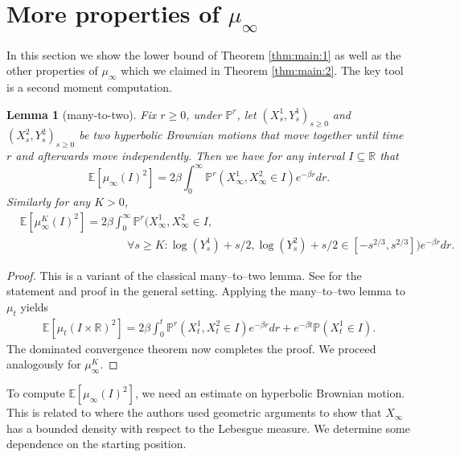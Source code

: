 \documentclass{article}
\newtheorem{lem}[thm]{Lemma}
\theoremstyle{definition}
\numberwithin{equation}{section}
\numberwithin{thm}{section}
\newcommand*{\RR}{\ensuremath{\mathbb{R}}}	        	%
\newcommand*{\EE}{\ensuremath{\mathbb{E}}}	        	%
\newcommand*{\PP}{\ensuremath{\mathbb{P}}}	        	%
\begin{document}
\section{More properties of \texorpdfstring{$\mu_\infty$}{mu}}\label{sec:more_properties}

In this section we show the lower bound of Theorem \ref{thm:main:1} as well as the other properties of $\mu_\infty$ which we claimed in Theorem \ref{thm:main:2}. The key tool is a second moment computation. 

\begin{lem}[many-to-two] \label{lemma:many_to_two}
    {Fix $r\geq 0$,} under $\PP^r$, let $(X_s^1,Y_s^1)_{s\geq 0}$ and $(X_s^2,Y_s^2)_{s\geq 0}$ be two hyperbolic Brownian motions that move together until time $r$ and afterwards move independently. Then we have for any interval $I\subseteq \RR$ that 
    \begin{equation*}
        \EE\left[\mu_\infty(I)^2\right] = 2\beta\int_0^\infty\PP^r\left(X^1_\infty,X_\infty^2\in I\right) e^{-\beta r}dr.
    \end{equation*}
    Similarly for any $K>0$,
        \begin{align*}
        &\EE\left[\mu_\infty^K(I)^2\right] = 2\beta\int_0^\infty\PP^r\bigg(X^1_\infty,X_\infty^2\in I, \\ 
        & \hspace{4cm}\forall s\geq K: \log(Y_s^1)+s/2, \log(Y_s^2)+s/2 \in [-s^{2/3},s^{2/3}]\bigg) e^{-\beta r}dr.
    \end{align*}
\end{lem}

\begin{proof}
    This is a variant of the classical many--to--two lemma. See \cite{harris_many--few_2017} for the statement and proof in the general setting. Applying the many--to--two lemma to $\mu_t$ yields
    \begin{align*}
        \EE\left[\mu_t(I\times \RR)^2\right] = 2\beta\int_0^t\PP^r\left(X^1_t,X_t^2\in I\right) e^{-\beta r}dr + e^{-\beta t} \PP\left(X_t^1 \in I\right).
    \end{align*}
    The dominated convergence theorem now completes the proof. We proceed analogously for $\mu^K_\infty.$
\end{proof}

To compute $\EE\left[\mu_\infty(I)^2\right]$, we need an estimate on hyperbolic Brownian motion. This is related to \cite[Lemma 6]{lalley_hyperbolic_1997} where {the authors} used geometric arguments to show that $X_\infty$ has a bounded density with respect to the Lebesgue measure. We determine some dependence on the starting position. 
\end{document}
